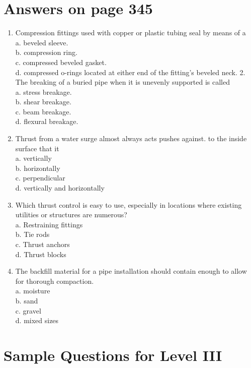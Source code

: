 \documentclass[10pt]{article}
\begin{document}
\section{Answers on page 345}
\begin{enumerate}
  \item Compression fittings used with copper or plastic tubing seal by means of a\\
a. beveled sleeve.\\
b. compression ring.\\
c. compressed beveled gasket.\\
d. compressed o-rings located at either end of the fitting's beveled neck. 2. The breaking of a buried pipe when it is unevenly supported is called\\
a. stress breakage.\\
b. shear breakage.\\
c. beam breakage.\\
d. flexural breakage.

  \item Thrust from a water surge almost always acts pushes against. to the inside surface that it\\
a. vertically\\
b. horizontally\\
c. perpendicular\\
d. vertically and horizontally

  \item Which thrust control is easy to use, especially in locations where existing utilities or structures are numerous?\\
a. Restraining fittings\\
b. Tie rods\\
c. Thrust anchors\\
d. Thrust blocks

  \item The backfill material for a pipe installation should contain enough to allow for thorough compaction.\\
a. moisture\\
b. sand\\
c. gravel\\
d. mixed sizes

\end{enumerate}

\section{Sample Questions for Level III}
\end{document}
